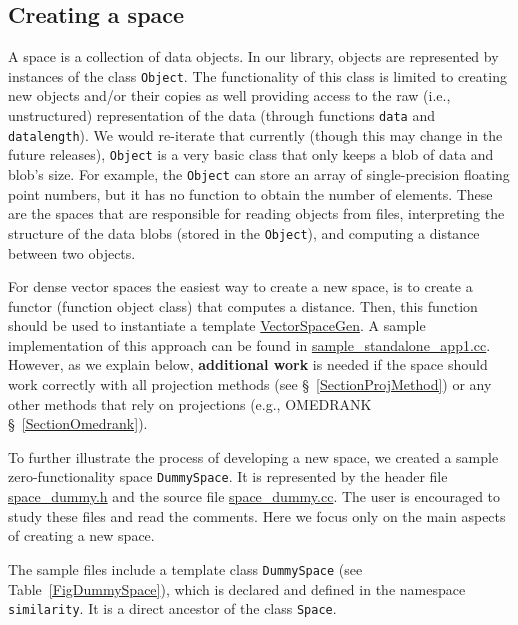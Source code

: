 \documentclass[runningheads,a4paper]{llncs}
\newcommand{\replocfile}{https://github.com/searchivarius/NonMetricSpaceLib/blob/pserv/}
\newcommand{\ttt}[1]{\texttt{#1}}
\begin{document}
\subsection{Creating a space}\label{SectionCreateSpace}
A space is a collection of data objects.
In our library, objects are represented by instances
of the class \ttt{Object}.
The functionality of this class is limited to
creating new objects and/or their copies as well providing
access to the raw (i.e., unstructured) representation of the data
(through functions \ttt{data} and \ttt{datalength}).
We would re-iterate that currently (though this may change in the future releases),
\ttt{Object} is a very basic class that only keeps a blob of data and blob's size.
For example, the \ttt{Object} can store an array of single-precision floating point
numbers, but it has no function to obtain the number of elements.
These are the spaces that are responsible for reading objects from files,
interpreting the structure of the data blobs (stored in the \ttt{Object}), 
and computing a distance between two objects.


For dense vector spaces the easiest way to create a new space,
is to create a functor (function object class) that computes a distance.
Then, this function should be used to instantiate a template
\href{\replocfile similarity_search/include/space/space_vector_gen.h}{VectorSpaceGen}.
A sample implementation of this approach can be found
in \href{\replocfile sample_standalone_app/sample_standalone_app1.cc#L114}{sample\_standalone\_app1.cc}.
However, as we explain below, \textbf{additional work} is needed if the space should work correctly with all projection methods 
(see \S~\ref{SectionProjMethod}) or any other methods that rely on projections (e.g., OMEDRANK \S~\ref{SectionOmedrank}).

To further illustrate the process of developing a new space,
we created a sample zero-functionality space \ttt{DummySpace}.
It is represented by 
the header file 
\href{\replocfile  similarity_search/include/space/space_dummy.h}{space\_dummy.h}
and the source file
\href{\replocfile similarity_search/src/space/space_dummy.cc}{space\_dummy.cc}.
The user is encouraged to study these files and read the comments.
Here we focus only on the main aspects of creating a new space.

The sample files include a template class \ttt{DummySpace} (see Table~\ref{FigDummySpace}), 
which is declared and defined in the namespace \ttt{similarity}.
It is a direct ancestor of the class \ttt{Space}.
\end{document}
